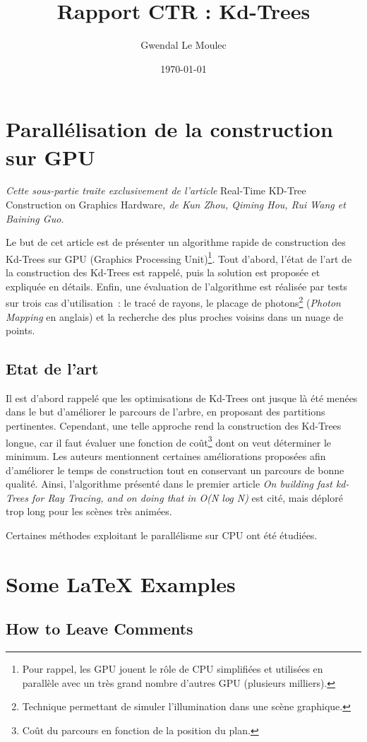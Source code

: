 \documentclass[a4paper]{article}
\title{Rapport CTR : Kd-Trees}
\author{Gwendal Le Moulec}
\date{\today}
\begin{document}
\section{Parallélisation de la construction sur GPU}

\textit{Cette sous-partie traite exclusivement de l'article} Real-Time KD-Tree Construction on Graphics Hardware\textit{, de Kun Zhou, Qiming Hou, Rui Wang et Baining Guo.}

Le but de cet article est de présenter un algorithme rapide de construction des Kd-Trees sur GPU (Graphics Processing Unit)\footnote{Pour rappel, les GPU jouent le rôle de CPU simplifiées et utilisées en parallèle avec un très grand nombre d'autres GPU (plusieurs milliers).}. Tout d'abord, l'état de l'art de la construction des Kd-Trees est rappelé, puis la solution est proposée et expliquée en détails. Enfin, une évaluation de l'algorithme est réalisée par tests sur trois cas d'utilisation~: le tracé de rayons, le placage de photons\footnote{Technique permettant de simuler l'illumination dans une scène graphique.} (\textit{Photon Mapping} en anglais) et la recherche des plus proches voisins dans un nuage de points.

\subsection{Etat de l'art}
Il est d'abord rappelé que les optimisations de Kd-Trees ont jusque là été menées dans le but d'améliorer le parcours de l'arbre, en proposant des partitions pertinentes. Cependant, une telle approche rend la construction des Kd-Trees longue, car il faut évaluer une fonction de coût\footnote{Coût du parcours en fonction de la position du plan.} dont on veut déterminer le minimum. Les auteurs mentionnent certaines améliorations proposées afin d'améliorer le temps de construction tout en conservant un parcours de bonne qualité. Ainsi, l'algorithme présenté dans le premier article \textit{On building fast kd-Trees for Ray Tracing, and on doing that in O(N log N)} est cité, mais déploré trop long pour les scènes très animées.

Certaines méthodes exploitant le parallélisme sur CPU ont été étudiées. 

\section{Some \LaTeX{} Examples}
\label{sec:examples}

\subsection{How to Leave Comments}
\end{document}
